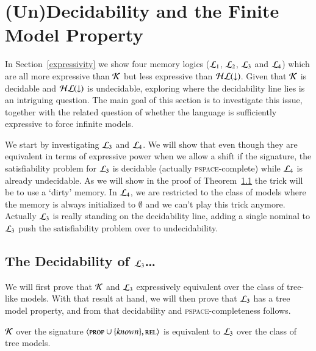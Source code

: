 \section{(Un)Decidability and the Finite Model Property}

In Section~\ref{expressivity} we show four memory logics ($\mathcal{L}_1$,
$\mathcal{L}_2$, $\mathcal{L}_3$ and $\mathcal{L}_4$) which are all more expressive
than $\mathcal{K}$ but less expressive than $\mathcal{HL}({\downarrow})$. Given that $\mathcal{K}$ is
decidable and $\mathcal{HL}({\downarrow})$ is undecidable, exploring where the
decidability line lies is an intriguing question.  The main goal of
this section is to investigate this issue, together with the related
question of whether the language is sufficiently expressive to force
infinite models.

We start by investigating $\mathcal{L}_3$ and $\mathcal{L}_4$. We will show
that even though they are equivalent in terms of expressive power
when we allow a shift if the signature, the satisfiability problem
for $\mathcal{L}_3$ is decidable (actually \textsc{pspace}-complete) while
$\mathcal{L}_4$ is already undecidable. As we will show in the proof of
Theorem~\ref{} the trick will be to use a `dirty' memory. In
$\mathcal{L}_4$, we are restricted to the class of models where the
memory is always initialized to $\emptyset$ and we can't play this
trick anymore.  Actually $\mathcal{L}_3$ is really standing on the
decidability line, adding a single nominal to $\mathcal{L}_3$ push the
satisfiability problem over to undecidability.

\subsection{The Decidability of $\mathcal{L}_3$\ldots}

We will first prove that $\mathcal{K}$ and $\mathcal{L}_3$ expressively
equivalent over the class of tree-like models.  With that result
at hand, we will then prove that $\mathcal{L}_3$ has a tree model
property, and from that decidability and \textsc{pspace}-completeness
follows.



\begin{thm}\label{prop:sat-preserv-tree}
$\mathcal{K}$  over the signature $\langle \textsc{prop} \cup \{\mathit{known}\},\textsc{rel} \rangle$
is equivalent to $\mathcal{L}_3$ over the class of tree models.
\end{thm}

